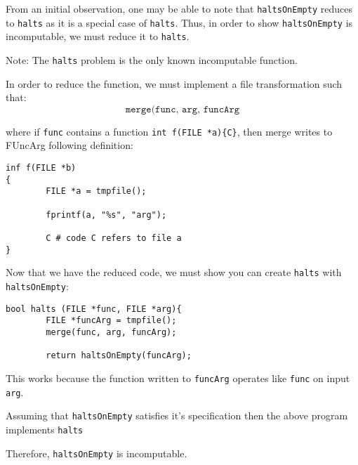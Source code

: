\documentclass[12pt]{book}
\begin{document}
From an initial observation, one may be able to note that \texttt{haltsOnEmpty} reduces to 
\texttt{halts} as it is a special case of \texttt{halts}. Thus, in order
to show \texttt{haltsOnEmpty} is incomputable, we must reduce it to \texttt{halts}.

Note: The \texttt{halts} problem is the only known incomputable function.
\pagebreak

In order to reduce the function, we must implement a file transformation such that:
\[\texttt{merge(func, arg, funcArg}\]

where if \texttt{func} contains a function \texttt{int f(FILE *a)\{C\}}, then
merge writes to FUncArg following definition:
\begin{verbatim}
inf f(FILE *b)
{ 
        FILE *a = tmpfile();
        
        fprintf(a, "%s", "arg");

        C # code C refers to file a
}
\end{verbatim}

Now that we have the reduced code, we must show you can create \texttt{halts} with
\texttt{haltsOnEmpty}:
\begin{verbatim}
bool halts (FILE *func, FILE *arg){
        FILE *funcArg = tmpfile();
        merge(func, arg, funcArg);

        return haltsOnEmpty(funcArg);
\end{verbatim}

This works because the function written to \texttt{funcArg} operates
like \texttt{func} on input \texttt{arg}.

Assuming that \texttt{haltsOnEmpty} satisfies it's specification then the
above program implements \texttt{halts}

Therefore, \texttt{haltsOnEmpty} is incomputable.
\end{document}
